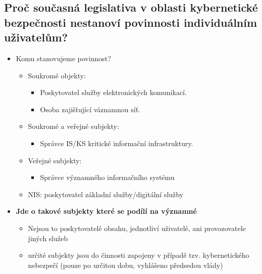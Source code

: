\subsection{ Proč současná legislativa v oblasti kybernetické bezpečnosti nestanoví povinnosti individuálním uživatelům?}
\begin{itemize}
    \item Komu stanovujeme povinnost?
    \begin{itemize}
        \item Soukromé objekty:
        \begin{itemize}
            \item Poskytovatel služby elektronických komunikací.
            \item Osoba zajišťující váznamnou síť.
        \end{itemize}
        \item Soukromé a veřejné subjekty:
        \begin{itemize}
            \item Správce IS/KS kritické informační infrastruktury.
        \end{itemize}
        \item Veřejné subjekty:
        \begin{itemize}
            \item Správce významného informačního systému
        \end{itemize}
        \item NIS: poskytovatel základní služby/digitální služby
    \end{itemize}
    \item \textbf{Jde o takové subjekty které se podílí na významné}
    \begin{itemize}
        \item Nejsou to poskytovatelé obsahu, jednotliví uživatelé, ani provozovatele jiných služeb
        \item určité subjekty jsou do činnosti zapojeny v případě tzv. kybernetického nebezpečí (pouze po určitou dobu, vyhlášeno předsedou vlády)
    \end{itemize}
\end{itemize}



